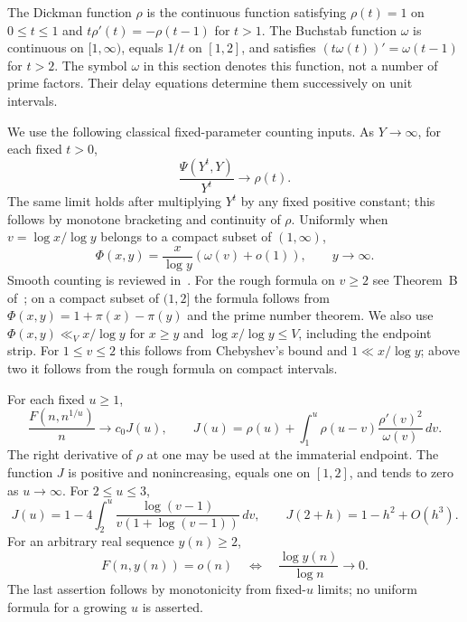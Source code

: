 The Dickman function $\rho$ is the continuous function satisfying $\rho(t)=1$ on $0\le t\le1$ and $t\rho'(t)=-\rho(t-1)$ for $t>1$. The Buchstab function $\omega$ is continuous on $[1,\infty)$, equals $1/t$ on $[1,2]$, and satisfies $(t\omega(t))'=\omega(t-1)$ for $t>2$. The symbol $\omega$ in this section denotes this function, not a number of prime factors. Their delay equations determine them successively on unit intervals.

We use the following classical fixed-parameter counting inputs. As $Y\to\infty$, for each fixed $t>0$,
\begin{equation}\label{geo:smoothinput}
 \frac{\Psi(Y^t,Y)}{Y^t}\longrightarrow\rho(t).
\end{equation}
The same limit holds after multiplying $Y^t$ by any fixed positive constant; this follows by monotone bracketing and continuity of $\rho$. Uniformly when $v=\log x/\log y$ belongs to a compact subset of $(1,\infty)$,
\begin{equation}\label{geo:roughinput}
 \Phi(x,y)=\frac{x}{\log y}(\omega(v)+o(1)),\qquad y\to\infty.
\end{equation}
Smooth counting is reviewed in~\cite{hildebrandtenenbaum,mcnew}. For the rough formula on $v\ge2$ see Theorem~B of~\cite{fanpomerance}; on a compact subset of $(1,2]$ the formula follows from $\Phi(x,y)=1+\pi(x)-\pi(y)$ and the prime number theorem. We also use $\Phi(x,y)\ll_V x/\log y$ for $x\ge y$ and $\log x/\log y\le V$, including the endpoint strip. For $1\le v\le2$ this follows from Chebyshev's bound and $1\ll x/\log y$; above two it follows from the rough formula on compact intervals.

\begin{theorem}\label{geo:profile}
For each fixed $u\ge1$,
\begin{equation}\label{geo:J}
 \frac{F(n,n^{1/u})}{n}\longrightarrow c_0J(u),\qquad
 J(u)=\rho(u)+\int_1^u\rho(u-v)\frac{\rho'(v)^2}{\omega(v)}\,dv.
\end{equation}
The right derivative of $\rho$ at one may be used at the immaterial endpoint. The function $J$ is positive and nonincreasing, equals one on $[1,2]$, and tends to zero as $u\to\infty$. For $2\le u\le3$,
\begin{equation}\label{geo:explicitJ}
 J(u)=1-4\int_2^u\frac{\log(v-1)}{v(1+\log(v-1))}\,dv,
 \qquad J(2+h)=1-h^2+O(h^3).
\end{equation}
For an arbitrary real sequence $y(n)\ge2$,
\begin{equation}\label{geo:cutoff}
 F(n,y(n))=o(n)\quad\Longleftrightarrow\quad
 \frac{\log y(n)}{\log n}\longrightarrow0.
\end{equation}
The last assertion follows by monotonicity from fixed-$u$ limits; no uniform formula for a growing $u$ is asserted.
\end{theorem}

